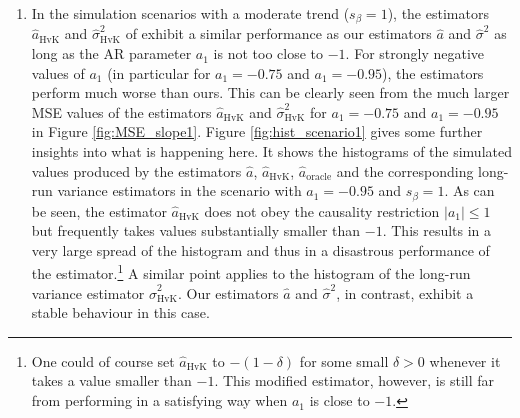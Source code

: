 \begin{enumerate}[label=(\alph*),leftmargin=0.7cm]


\item In the simulation scenarios with a moderate trend ($s_\beta = 1$), the estimators $\widehat{a}_{\text{HvK}}$ and $\widehat{\sigma}^2_{\text{HvK}}$ of \cite{Hall2003} exhibit a similar performance as our estimators $\widehat{a}$ and $\widehat{\sigma}^2$ as long as the AR parameter $a_1$ is not too close to $-1$. For strongly negative values of $a_1$ (in particular for $a_1 = -0.75$ and $a_1 = -0.95$), the estimators perform much worse than ours. This can be clearly seen from the much larger MSE values of the estimators  $\widehat{a}_{\text{HvK}}$ and $\widehat{\sigma}^2_{\text{HvK}}$ for $a_1 = -0.75$ and $a_1 = -0.95$ in Figure \ref{fig:MSE_slope1}. Figure \ref{fig:hist_scenario1} gives some further insights into what is happening here. It shows the histograms of the simulated values produced by the estimators $\widehat{a}$, $\widehat{a}_{\text{HvK}}$, $\widehat{a}_{\text{oracle}}$ and the corresponding long-run variance estimators in the scenario with $a_1=-0.95$ and $s_\beta = 1$. As can be seen, the estimator $\widehat{a}_{\text{HvK}}$ does not obey the causality restriction $|a_1| \le 1$ but frequently takes values substantially smaller than $-1$. This results in a very large spread of the histogram and thus in a disastrous performance of the estimator.\footnote{One could of course set $\widehat{a}_{\text{HvK}}$ to $-(1 - \delta)$ for some small $\delta > 0$ whenever it takes a value smaller than $-1$. This modified estimator, however, is still far from performing in a satisfying way when $a_1$ is close to $-1$.} A similar point applies to the histogram of the long-run variance estimator $\widehat{\sigma}^2_{\text{HvK}}$. Our estimators $\widehat{a}$ and $\widehat{\sigma}^2$, in contrast, exhibit a stable behaviour in this case. \\ %

\end{enumerate}
